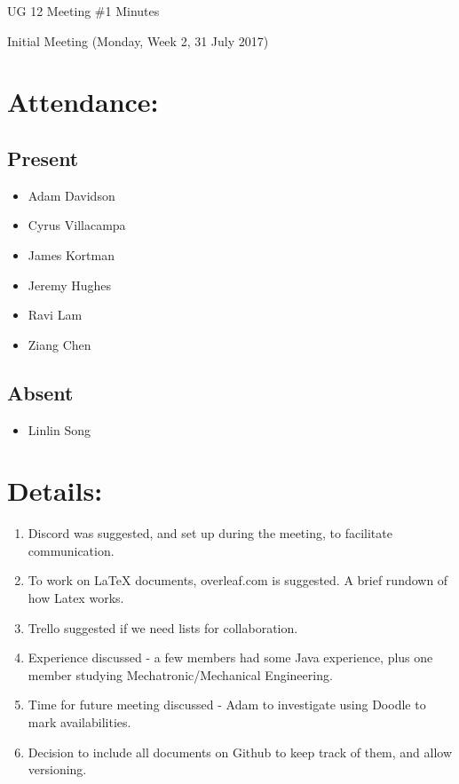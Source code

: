 \documentclass{article}
\begin{document}
\begin{adjustwidth}{2.5em}{0pt}
\begin{center}
\Large{UG 12 Meeting \#1 Minutes}\\
\end{center}
\end{adjustwidth}


Initial Meeting (Monday, Week 2, 31 July 2017)
\section{Attendance:}
\subsection*{Present}
\begin{itemize}
\item Adam Davidson
\item Cyrus Villacampa
\item James Kortman
\item Jeremy Hughes
\item Ravi Lam
\item Ziang Chen
\end{itemize}
\subsection*{Absent}
\begin{itemize}
\item Linlin Song
\end {itemize}

\section{Details:}
\begin{enumerate}
\item Discord was suggested, and set up during the meeting, to facilitate communication.
\item To work on LaTeX documents, overleaf.com is suggested. A brief rundown of how Latex works.
\item Trello suggested if we need lists for collaboration.
\item Experience discussed - a few members had some Java experience, plus one member studying Mechatronic/Mechanical Engineering.
\item Time for future meeting discussed - Adam to investigate using Doodle to mark availabilities.
\item Decision to include all documents on Github to keep track of them, and allow versioning.
\end{enumerate}
\end{document}
